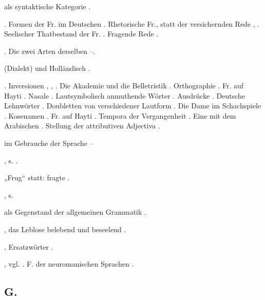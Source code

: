 \begin{register}
 als syntaktische Kategorie \pageref{sp.104}.

. Formen der Fr. im Deutschen \pageref{sp.96}. Rhetorische Fr., statt der versichernden Rede \pageref{sp.183}, \pageref{sp.244}. Seelischer Thatbestand der Fr. \pageref{sp.310}. Fragende Rede \pageref{sp.319}.

 \pageref{sp.103}. Die zwei Arten derselben \pageref{sp.468}–\pageref{sp.469}.

 (Dialekt) und Holländisch \pageref{sp.159}.

. Inversionen \pageref{sp.103}, \pageref{sp.370}, \pageref{sp.371}. Die Akademie und die Belletristik \pageref{sp.126}. Orthographie \pageref{sp.132}. Fr. auf Hayti \pageref{sp.147}. Nasale \pageref{sp.148}.  Lautsymbolisch anmuthende Wörter \pageref{sp.219}.  Ausdrücke \pageref{sp.243}. Deutsche Lehnwörter \pageref{sp.264}. Doubletten von verschiedener Lautform \pageref{sp.267}. Die Dame im Schachspiele \pageref{sp.268}. Kosenamen \pageref{sp.278}. Fr. auf Hayti \pageref{sp.293}.  Tempora der Vergangenheit \pageref{sp.430}. Eine  mit dem Arabischen \pageref{sp.441}.  Stellung der attributiven Adjectiva \pageref{sp.457}. 

 im Gebrauche der Sprache \pageref{sp.234}–\pageref{sp.239}

, s. .

„Frug“ statt: fragte \pageref{sp.186}.

, s. 

 als Gegenstand der allgemeinen Grammatik \pageref{sp.480}.

, das Leblose belebend und beseelend \pageref{sp.315}.

, Ersatzwörter \pageref{sp.101}.

, vgl.  \pageref{sp.103}. F. der neuromanischen Sprachen \sed{\pageref{sp.159},} \pageref{sp.348}.

\subsection*{G.}\label{reg.G}


\end{register}

